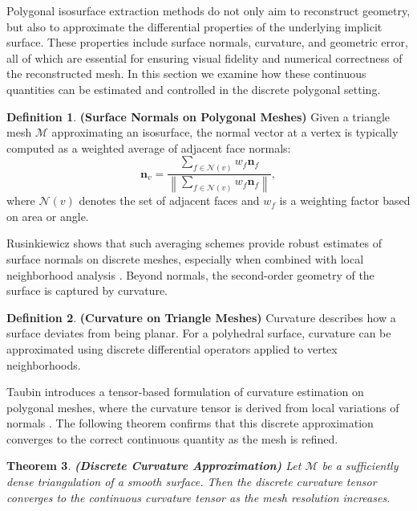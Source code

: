 \documentclass[12pt, a4paper, oneside]{book}
\theoremstyle{plain}
\newtheorem{theorem}{Theorem}[chapter]
\theoremstyle{definition}
\newtheorem{definition}[theorem]{Definition}
\theoremstyle{remark}
\theoremstyle{definition}
\begin{document}
Polygonal isosurface extraction methods do not only aim to reconstruct geometry, but also
to approximate the differential properties of the underlying implicit surface. These
properties include surface normals, curvature, and geometric error, all of which are
essential for ensuring visual fidelity and numerical correctness of the reconstructed
mesh. In this section we examine how these continuous quantities can be estimated and
controlled in the discrete polygonal setting.

\vspace{0.5em}

\begin{definition}
    \textbf{(Surface Normals on Polygonal Meshes)}
Given a triangle mesh $\mathcal{M}$ approximating an isosurface, the normal vector at a
vertex is typically computed as a weighted average of adjacent face normals:
\[
\mathbf{n}_v = \frac{\sum_{f \in \mathcal{N}(v)} w_f \mathbf{n}_f}{\left\|\sum_{f \in
\mathcal{N}(v)} w_f \mathbf{n}_f \right\|},
\]
where $\mathcal{N}(v)$ denotes the set of adjacent faces and $w_f$ is a weighting factor
based on area or angle.
\end{definition}

Rusinkiewicz shows that such averaging schemes provide robust estimates of surface normals
on discrete meshes, especially when combined with local neighborhood analysis
\cite{rusinkiewicz2004estimating}. Beyond normals, the second-order geometry of the
surface is captured by curvature.

\vspace{0.5em}

\begin{definition}
    \textbf{(Curvature on Triangle Meshes)}
Curvature describes how a surface deviates from being planar. For a polyhedral surface,
curvature can be approximated using discrete differential operators applied to vertex
neighborhoods.
\end{definition}

Taubin introduces a tensor-based formulation of curvature estimation on polygonal meshes,
where the curvature tensor is derived from local variations of normals
\cite{taubin1995estimating}. The following theorem confirms that this discrete
approximation converges to the correct continuous quantity as the mesh is refined.

\begin{theorem}
    \textbf{(Discrete Curvature Approximation)}
Let $\mathcal{M}$ be a sufficiently dense triangulation of a smooth surface. Then the
discrete curvature tensor converges to the continuous curvature tensor as the mesh
resolution increases.
\end{theorem}
\end{document}
